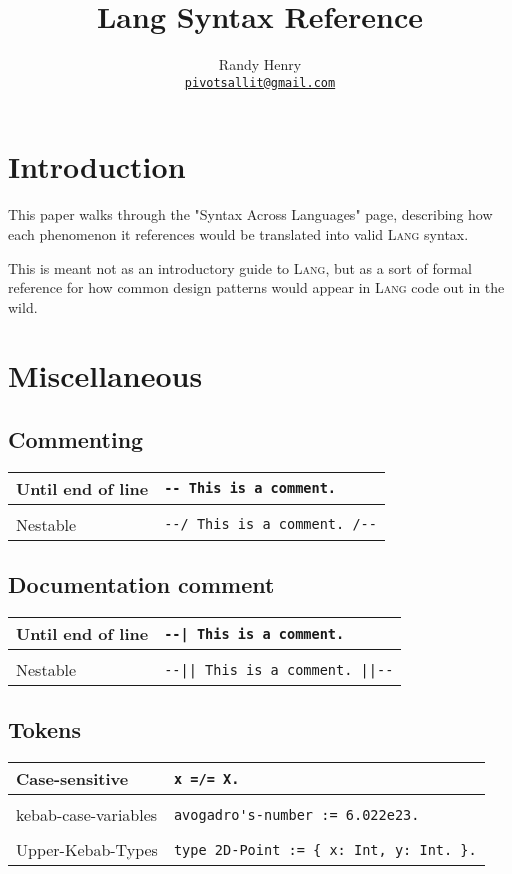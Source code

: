 \documentclass[a4paper,12pt]{article}
\author{
        Randy Henry \\ 
        \href{mailto:pivotsallit@gmail.com}
        {{\small \texttt{pivotsallit@gmail.com}}}}
\title{Lang Syntax Reference}
\makeatletter
\newcommand{\code}{\lstinline}
\newcommand{\br}{\\ [0.5em] \hline \\ [-0.5em]}
\newenvironment{data}
    {
        \begin{center}
        \begin{tabular*}{\textwidth}{ l@{\extracolsep{\fill}}l }
    }
    {
        \end{tabular*}
        \end{center}
    }
\makeatother
\begin{document}
\maketitle
\tableofcontents

\newpage

\section{Introduction}
    This paper walks through the "Syntax Across Languages" \cite{SAL}
    page, describing how each phenomenon it references would be translated
    into valid \textsc{Lang} syntax.

    This is meant not as an introductory guide to \textsc{Lang}, but as a sort 
    of formal reference for how common design patterns would appear 
    in \textsc{Lang} code out in the wild.


\section{Miscellaneous} 
\subsection{Commenting}
    \begin{data}
        Until end of line & 
            \code|-- This is a comment.| \br
        Nestable          & 
            \code$--/ This is a comment. /--$
    \end{data}

\subsection{Documentation comment}
    \begin{data}
        Until end of line & 
            \code$--| This is a comment.$ \br
        Nestable          & 
            \code$--|| This is a comment. ||--$
    \end{data}

\subsection{Tokens}
    \begin{data}
        Case-sensitive       & 
            \code|x =/= X.| \br
        kebab-case-variables & 
            \code|avogadro's-number := 6.022e23.| \br
        Upper-Kebab-Types    & 
            \code|type 2D-Point := { x: Int, y: Int. }.|
    \end{data}
    
\end{document}
